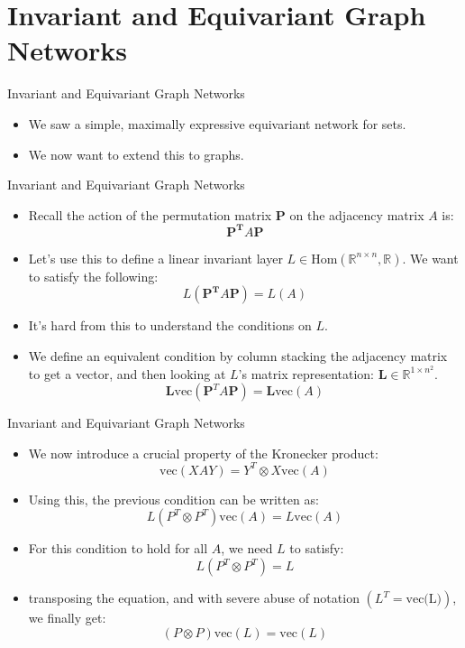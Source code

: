 \documentclass{beamer}
\begin{document}
\section{Invariant and Equivariant Graph Networks}

\begin{frame}{Invariant and Equivariant Graph Networks}
    \begin{itemize}
        \setlength{\itemsep}{\fill}
        \item We saw a simple, maximally expressive equivariant network for sets.
        \item We now want to extend this to graphs.
    \end{itemize}
\end{frame}
\begin{frame}{Invariant and Equivariant Graph Networks}
    \begin{itemize}
        \setlength{\itemsep}{\fill}
        \item Recall the action of the permutation matrix $\boldsymbol{P}$ on the adjacency matrix $A$ is:
        \[\boldsymbol{P^T}A\boldsymbol{P}\]
        \item Let's use this to define a linear invariant layer $L \in \text{Hom}(\mathbb{R}^{n\times n}, \mathbb{R})$. We want to satisfy the following:
        \[ L(\boldsymbol{P^T}A\boldsymbol{P}) = L(A) \]
        \item It's hard from this to understand the conditions on $L$. 
        \pause
        \item We define an equivalent condition by column stacking the adjacency matrix to get a vector, and then looking at $L$'s matrix representation: $\mathbf{L} \in \mathbb{R}^{1 \times n^2}$.
        \[ \mathbf{L}\text{vec}(\boldsymbol{P}^T A\boldsymbol{P}) = \mathbf{L}\text{vec}(A) \]
    \end{itemize}
\end{frame}
\begin{frame}{Invariant and Equivariant Graph Networks}
    \begin{itemize}
        \setlength{\itemsep}{\fill}
        \item We now introduce a crucial property of the Kronecker product:
        \[ \text{vec}(XAY)= Y^T\otimes X\text{vec}(A)\]
        \item Using this, the previous condition can be written as:
        \[ L(P^T\otimes P^T)\text{vec}(A) = L\text{vec}(A) \]
        \item For this condition to hold for all $A$, we need $L$ to satisfy:
        \[ L(P^T\otimes P^T) = L \]
        \item transposing the equation, and with severe abuse of notation $(L^T = \text{vec(L)})$, we finally get:
        \[ (P\otimes P)\text{vec}(L) = \text{vec}(L) \]
    \end{itemize}
\end{frame}
\end{document}

